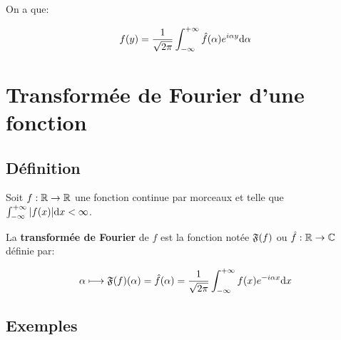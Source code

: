 \begin{remark}
    On a que:
    
    \[
    f(y) =
    \frac{1}{\sqrt{2 \pi}}
    \int_{-\infty}^{+\infty}
    \hat{f}(\alpha)
    e^{i \alpha y}
    \mathrm{d}\alpha
    \]
\end{remark}



\section{Transformée de Fourier d'une fonction}


\subsection{Définition}

\begin{definition}[15.1, p.113]
    Soit $f: \mathbb{R} \rightarrow \mathbb{R}$ une fonction continue par morceaux et telle que $\int_{-\infty}^{+\infty} | f(x) | \mathrm{d}x < \infty$.
    
    La \textbf{transformée de Fourier} de $f$ est la fonction notée $\mathfrak{F}(f)$ ou $\hat{f}: \mathbb{R} \rightarrow \mathbb{C}$ définie par:
    
    \[
    \alpha \longmapsto
    \mathfrak{F}(f)(\alpha) = \hat{f}(\alpha) =
    \frac{1}{\sqrt{2 \pi}}
    \int_{-\infty}^{+\infty}
    f(x) e^{-i \alpha x}
    \mathrm{d}x
    \]
\end{definition}


\subsection{Exemples}

